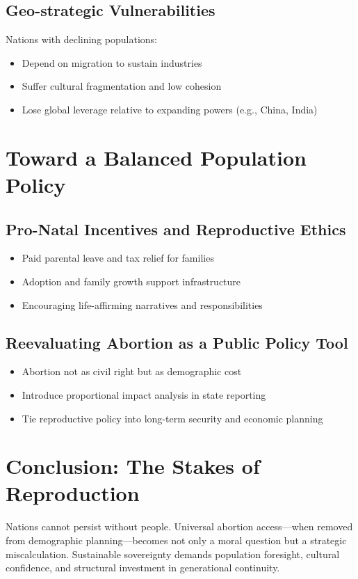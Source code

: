 \documentclass[11pt]{article}
\begin{document}
\subsection{Geo-strategic Vulnerabilities}
Nations with declining populations:
\begin{itemize}
    \item Depend on migration to sustain industries
    \item Suffer cultural fragmentation and low cohesion
    \item Lose global leverage relative to expanding powers (e.g., China, India)
\end{itemize}

\section{Toward a Balanced Population Policy}
\subsection{Pro-Natal Incentives and Reproductive Ethics}
\begin{itemize}
    \item Paid parental leave and tax relief for families
    \item Adoption and family growth support infrastructure
    \item Encouraging life-affirming narratives and responsibilities
\end{itemize}

\subsection{Reevaluating Abortion as a Public Policy Tool}
\begin{itemize}
    \item Abortion not as civil right but as demographic cost
    \item Introduce proportional impact analysis in state reporting
    \item Tie reproductive policy into long-term security and economic planning
\end{itemize}

\section{Conclusion: The Stakes of Reproduction}
Nations cannot persist without people. Universal abortion access—when removed from demographic planning—becomes not only a moral question but a strategic miscalculation. Sustainable sovereignty demands population foresight, cultural confidence, and structural investment in generational continuity.
\end{document}
